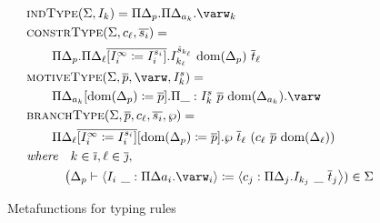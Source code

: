 \begin{figure}
\centering
\begin{align*}
    &\indtype{\Sigma}{I_k} = \Pi \Delta_p . \Pi \Delta_{a_k} . \varw_k \\
    &\constrtype{\Sigma}{c_\ell}{\overline{s_i}} = \\
    &\qquad \Pi \Delta_p . \Pi \Delta_\ell \overline{[I_i^\infty \coloneqq I_i^{s_i}]} . I_{k_\ell}^{\hat{s}_{k_\ell}}\ \dom{\Delta_p}\ \overline{t}_\ell \\
    &\motivetype{\Sigma}{\overline{p}}{\varw}{I_k^s} = \\
    &\qquad \Pi \Delta_{a_k}[\dom{\Delta_p} \coloneqq \overline{p}] . \Pi \_ : I_k^s\ \overline{p}\ \dom{\Delta_{a_k}} . \varw \\
    &\branchtype{\Sigma}{\overline{p}}{c_\ell}{\overline{s_i}}{\wp} = \\
    &\qquad \Pi \Delta_\ell \overline{[I_i^\infty \coloneqq I_i^{s_i}]}[\dom{\Delta_p} \coloneqq \overline{p}] . \wp\ \overline{t}_\ell\ (c_\ell\ \overline{p}\ \dom{\Delta_\ell}) \\
    &\textit{where}\quad k \in \overline{\imath}, \ell \in \overline{\jmath}, \\
    &\quad\qquad\big(\Delta_p \vdash \langle I_i\ \_ : \Pi\Delta{a_i} . \varw_i \rangle \coloneqq \langle c_j : \Pi \Delta_j . I_{k_j}\ \_\ \overline{t}_j \big \rangle) \in \Sigma
\end{align*}
\caption{Metafunctions for typing rules}
\label{fig:metafunctions}
\end{figure}